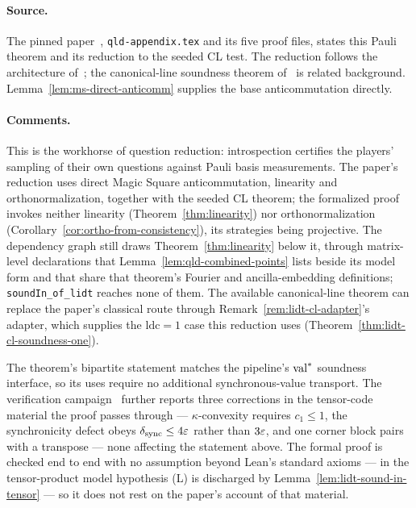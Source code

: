 \paragraph{Source.} The pinned paper~\cite{AuditSync26}, \texttt{qld-appendix.tex}
and its five proof files, states this Pauli theorem and its reduction to the seeded
CL test. The reduction follows the architecture of~\cite[Section 7]{JNVWY20};
the canonical-line soundness theorem of~\cite{JNVWY21qld} is related background.
Lemma~\ref{lem:ms-direct-anticomm} supplies the base anticommutation directly.

\paragraph{Comments.} This is the
workhorse of question reduction: introspection certifies the players' sampling of
their own questions against Pauli basis measurements. The paper's reduction uses direct
Magic Square anticommutation, linearity and orthonormalization, together with the
seeded CL theorem; the formalized proof invokes neither linearity (Theorem~\ref{thm:linearity}) nor
orthonormalization (Corollary~\ref{cor:ortho-from-consistency}), its strategies being projective.
The dependency graph still draws Theorem~\ref{thm:linearity} below it, through matrix-level
declarations that Lemma~\ref{lem:qld-combined-points} lists beside its model form and that share
that theorem's Fourier and ancilla-embedding definitions; \texttt{soundIn\_of\_lidt} reaches none
of them. The available canonical-line theorem can replace the paper's
classical route through Remark~\ref{rem:lidt-cl-adapter}'s adapter, which supplies the
$\mathrm{ldc}=1$ case this reduction uses (Theorem~\ref{thm:lidt-cl-soundness-one}).

The theorem's bipartite statement matches the pipeline's $\mathrm{val}^*$ soundness
interface, so its uses require no additional synchronous-value transport. The verification
campaign~\cite{Audit26} further reports three corrections in the tensor-code material the
proof passes through --- $\kappa$-convexity requires $c_1 \leq 1$, the synchronicity
defect obeys $\delta_{\mathrm{sync}} \leq 4\varepsilon$ rather than $3\varepsilon$, and one corner block
pairs with a transpose --- none affecting the statement above. The formal proof is
checked end to end with no assumption beyond Lean's standard axioms --- in the tensor-product
model hypothesis (L) is discharged by Lemma~\ref{lem:lidt-sound-in-tensor} --- so it does not rest
on the paper's account of that material.

